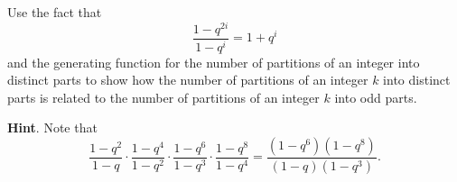 \documentclass{book}
\begin{document}
\setcounter{cpjt}{324}
\addtocounter{cpjt}{-1}
\begin{activity}\label{activity-317}
\hypertarget{p-1604}{}%
Use the fact that%
\begin{equation*}
\frac{1-q^{2i}}{1-q^i}= 1+q^i
\end{equation*}
and the generating function for the number of partitions of an integer into distinct parts to show how the number of partitions of an integer \(k\) into distinct parts is related to the number of partitions of an integer \(k\) into odd parts.%
\par\smallskip%
\noindent\textbf{Hint}.\hypertarget{hint-215}{}\quad%
\hypertarget{p-1605}{}%
Note that%
\begin{equation*}
\frac{1-q^2}{1-q}\cdot \frac{1-q^4}{1-q^2}\cdot \frac{1-q^6}{1-q^3}\cdot \frac{1-q^8}{1-q^4} = \frac{(1-q^6)(1-q^8)}{(1-q)(1-q^3)} \text{.}
\end{equation*}
%
\par\smallskip%
\noindent\end{activity}

\clearpage
\end{document}
